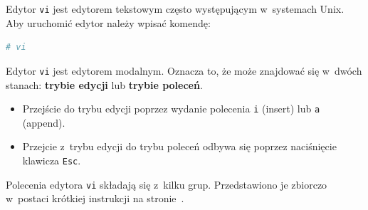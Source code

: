 \documentclass[11pt,twoside,a4paper]{article}
\begin{document}
\begin{example}\label{ex:vi} 


Edytor \lstinline{vi} jest edytorem tekstowym często występującym w~systemach Unix. Aby uruchomić edytor należy wpisać komendę: 

\begin{lstlisting}[language=bash]
# vi
\end{lstlisting}

 Edytor \lstinline{vi} jest edytorem modalnym. Oznacza to, że może znajdować się w~dwóch stanach: \textbf{trybie edycji} lub \textbf{trybie poleceń}. 
 
\begin{itemize}
\item Przejście do trybu edycji poprzez wydanie polecenia \lstinline{i} (insert) lub \lstinline{a} (append).
\item Przejcie z~trybu edycji do trybu poleceń odbywa się poprzez naciśnięcie klawicza \lstinline{Esc}. 
\end{itemize}

Polecenia edytora \lstinline{vi} składają się z~kilku grup. Przedstawiono je zbiorczo w~postaci krótkiej instrukcji na stronie~\pageref{viRef}.
\end{example} 

\clearpage  
{}
{\label{viRef}

}
\end{document}
